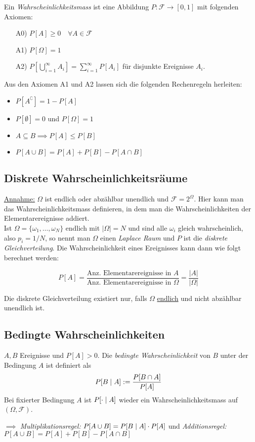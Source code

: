 \begin{definition}
Ein \textit{Wahrscheinlichkeitsmass} ist eine Abbildung $P: \mathcal{F}\to [0,1]$ mit folgenden Axiomen:
\begin{itemize}
\item[A0)] $P[A] \geq 0 \quad \forall A\in \mathcal{F}$
\item[A1)] $P[\Omega] = 1$
\item[A2)] $P\left[\bigcup_{i=1}^\infty A_i\right] = \sum_{i=1}^\infty P[A_i]$ für disjunkte Ereignisse $A_i$.
\end{itemize}
\end{definition}
Aus den Axiomen A1 und A2 lassen sich die folgenden Rechenregeln herleiten:
\begin{itemize}
\item $P[A^\complement] = 1 - P[A]$
\item $P[\emptyset] = 0$ und $P[\Omega] = 1$
\item $A \subseteq B \implies P[A] \leq P[B]$
\item $P[A \cup B] = P[A] + P[B] - P[A\cap B]$
\end{itemize}

\subsection{Diskrete Wahrscheinlichkeitsräume}
\underline{Annahme:} $\Omega$ ist endlich oder abzählbar unendlich und $\mathcal{F}=2^\Omega$. Hier kann man das Wahrscheinlichkeitsmass definieren, in dem man die Wahrscheinlichkeiten der Elementarereignisse addiert.\\

Ist $\Omega = \{\omega_1, \dots, \omega_N\}$ endlich mit $|\Omega| = N$ und sind alle $\omega_i$ gleich wahrscheinlich, also $p_i = 1/N$, so nennt man $\Omega$ einen \textit{Laplace Raum} und $P$ ist die \textit{diskrete Gleichverteilung}. Die Wahrscheinlichkeit eines Ereignisses kann dann wie folgt berechnet werden:

$$ P[A] = \frac{\mbox{Anz. Elementarereignisse in } A}{\mbox{Anz. Elementarereignisse in } \Omega} = \frac{|A|}{|\Omega|}$$

Die diskrete Gleichverteilung existiert nur, falls $\Omega$ \underline{endlich} und nicht abzählbar unendlich ist.

\subsection{Bedingte Wahrscheinlichkeiten}
\begin{definition}
$A,B$ Ereignisse und $P[A] > 0$. Die \textit{bedingte Wahrscheinlichkeit} von $B$ unter der Bedingung $A$ ist definiert als
$$ P[B \;|\; A] := \frac{P[B \cap A ]}{P[A]}$$
Bei fixierter Bedingung $A$ ist $P[\cdot \;|\; A]$ wieder ein Wahrscheinlichkeitsmass auf $(\Omega, \mathcal{F})$.
\end{definition}
$\implies$ \textit{Multiplikationsregel:} $P[A\cup B] = P[B \;|\; A] \cdot P[A]$ und \textit{Additionsregel:} $P[A\cup B] = P[A] + P[B] - P[A\cap B]$

